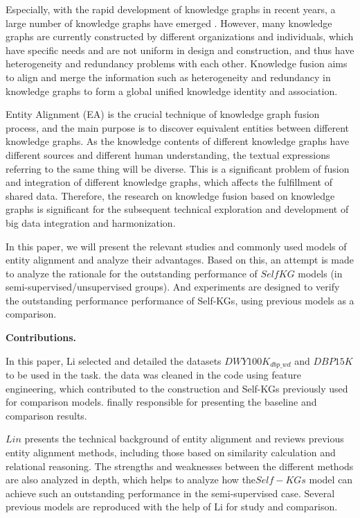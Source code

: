 \documentclass[sigconf]{acmart}
\begin{document}
Especially, with the rapid development of knowledge graphs in recent years, a large number of knowledge graphs have emerged \cite{hogan2021knowledge}. However, many knowledge graphs are currently constructed by different organizations and individuals, which have specific needs and are not uniform in design and construction, and thus have heterogeneity and redundancy problems with each other. Knowledge fusion aims to align and merge the information such as heterogeneity and redundancy in knowledge graphs to form a global unified knowledge identity and association.

Entity Alignment (EA)  \cite{liu2020exploring,zhao2020experimental}is the crucial technique of knowledge graph fusion process, and the main purpose is to discover equivalent entities between different knowledge graphs. As the knowledge contents of different knowledge graphs have different sources and different human understanding, the textual expressions referring to the same thing will be diverse. This is a significant problem of fusion and integration of different knowledge graphs, which affects the fulfillment of shared data. Therefore, the research on knowledge fusion based on knowledge graphs is significant for the subsequent technical exploration and development of big data integration and harmonization.

In this paper, we will present the relevant studies and commonly used models of entity alignment and analyze their advantages. Based on this, an attempt is made to analyze the rationale for the outstanding performance of $SelfKG$ models (in semi-supervised/unsupervised groups). And experiments are designed to verify the outstanding performance performance of Self-KGs, using previous models as a comparison.

\textbf{Contributions. } 

In this paper, Li selected and detailed the datasets $DWY100K_{dbp\_wd}$ and $DBP15K$ to be used in the task. the data was cleaned in the code using feature engineering, which contributed to the construction and Self-KGs previously used for comparison models. finally responsible for presenting the baseline and comparison results.

$Lin$ presents the technical background of entity alignment and reviews previous entity alignment methods, including those based on similarity calculation and relational reasoning. The strengths and weaknesses between the different methods are also analyzed in depth, which helps to analyze how the$ Self-KGs$ model can achieve such an outstanding performance in the semi-supervised case. Several previous models are reproduced with the help of Li for study and comparison.
\end{document}
